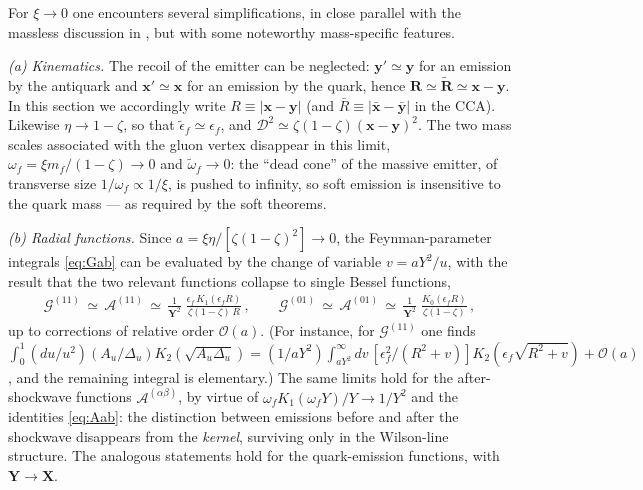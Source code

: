 \documentclass[11pt,a4paper]{article}
\newcommand{\calG}{\mathcal{G}}
\newcommand{\calA}{\mathcal{A}}
\newcommand{\calD}{\mathcal{D}}
\newcommand{\vx}{\bm{x}}
\newcommand{\vy}{\bm{y}}
\newcommand{\vxb}{\bar{\bm{x}}}
\newcommand{\vyb}{\bar{\bm{y}}}
\newcommand{\vR}{\bm{R}}
\newcommand{\vY}{\bm{Y}}
\newcommand{\vX}{\bm{X}}
\newcommand{\vRt}{\widetilde{\bm{R}}}
\newcommand{\eps}{\epsilon}
\numberwithin{equation}{section}
\begin{document}
For $\xi\to 0$ one encounters several simplifications, in close parallel with the massless
discussion in \cite{Iancu:2022gpw}, but with some noteworthy mass-specific features.

\emph{(a) Kinematics.} The recoil of the emitter can be neglected: $\vy'\simeq\vy$ for an
emission by the antiquark and $\vx'\simeq\vx$ for an emission by the quark, hence
$\vR\simeq\vRt\simeq\vx-\vy$. In this section we accordingly write $R\equiv|\vx-\vy|$ (and
$\bar R\equiv|\vxb-\vyb|$ in the CCA). Likewise $\eta\to1-\zeta$, so that
$\widetilde\eps_f\simeq\eps_f$, and $\calD^{2}\simeq\zeta(1-\zeta)(\vx-\vy)^{2}$. The two mass
scales associated with the gluon vertex disappear in this limit,
$\omega_f=\xi m_f/(1-\zeta)\to0$ and $\widetilde\omega_f\to 0$: the ``dead cone'' of the
massive emitter, of transverse size $1/\omega_f\propto1/\xi$, is pushed to infinity, so soft
emission is insensitive to the quark mass --- as required by the soft theorems.

\emph{(b) Radial functions.} Since $a=\xi\eta/[\zeta(1-\zeta)^{2}]\to 0$, the
Feynman-parameter integrals \eqref{eq:Gab} can be evaluated by the change of variable
$v=aY^{2}/u$, with the result that the two relevant functions collapse to single Bessel
functions,
\begin{align}
\label{eq:Gsoft}
\calG^{(11)} \,\simeq\, \calA^{(11)} \,\simeq\,
\frac{1}{\vY^{2}}\;\frac{\eps_{f}\,K_{1}(\eps_{f}R)}{\zeta(1-\zeta)\,R}\,,\qquad
\calG^{(01)} \,\simeq\, \calA^{(01)} \,\simeq\,
\frac{1}{\vY^{2}}\;\frac{K_{0}(\eps_{f}R)}{\zeta(1-\zeta)}\,,
\end{align}
up to corrections of relative order $\mathcal{O}(a)$. (For instance, for $\calG^{(11)}$ one finds
$\int_{0}^{1}({du}/{u^{2}})({A_{u}}/{\Delta_{u}})K_{2}(\sqrt{A_u\Delta_u})
=({1}/{aY^{2}})\int_{aY^{2}}^{\infty}dv\,[{\eps_f^{2}}/({R^{2}+v})]
K_{2}(\eps_f\sqrt{R^{2}+v})+\mathcal{O}(a)$, and the remaining integral is elementary.) The same
limits hold for the after-shockwave functions $\calA^{(\alpha\beta)}$, by virtue of
$\omega_f K_{1}(\omega_f Y)/Y\to 1/Y^{2}$ and the identities \eqref{eq:Aab}: the distinction
between emissions before and after the shockwave disappears from the \emph{kernel}, surviving
only in the Wilson-line structure. The analogous statements hold for the quark-emission
functions, with $\vY\to\vX$.
\end{document}
